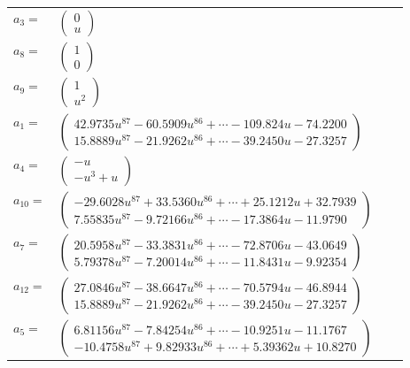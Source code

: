 \documentclass[1p]{elsarticle_modified}
\theoremstyle{definition}
\begin{document}
\begin{tabular}{m{7pt} m{180pt} m{7pt} m{180pt} }
\flushright $a_{3}=$&$\begin{pmatrix}0\\u\end{pmatrix}$ \\
\flushright $a_{8}=$&$\begin{pmatrix}1\\0\end{pmatrix}$ \\
\flushright $a_{9}=$&$\begin{pmatrix}1\\u^2\end{pmatrix}$ \\
\flushright $a_{1}=$&$\begin{pmatrix}42.9735 u^{87}-60.5909 u^{86}+\cdots-109.824 u-74.2200\\15.8889 u^{87}-21.9262 u^{86}+\cdots-39.2450 u-27.3257\end{pmatrix}$ \\
\flushright $a_{4}=$&$\begin{pmatrix}- u\\- u^3+u\end{pmatrix}$ \\
\flushright $a_{10}=$&$\begin{pmatrix}-29.6028 u^{87}+33.5360 u^{86}+\cdots+25.1212 u+32.7939\\7.55835 u^{87}-9.72166 u^{86}+\cdots-17.3864 u-11.9790\end{pmatrix}$ \\
\flushright $a_{7}=$&$\begin{pmatrix}20.5958 u^{87}-33.3831 u^{86}+\cdots-72.8706 u-43.0649\\5.79378 u^{87}-7.20014 u^{86}+\cdots-11.8431 u-9.92354\end{pmatrix}$ \\
\flushright $a_{12}=$&$\begin{pmatrix}27.0846 u^{87}-38.6647 u^{86}+\cdots-70.5794 u-46.8944\\15.8889 u^{87}-21.9262 u^{86}+\cdots-39.2450 u-27.3257\end{pmatrix}$ \\
\flushright $a_{5}=$&$\begin{pmatrix}6.81156 u^{87}-7.84254 u^{86}+\cdots-10.9251 u-11.1767\\-10.4758 u^{87}+9.82933 u^{86}+\cdots+5.39362 u+10.8270\end{pmatrix}$ \\

\end{tabular}
\end{document}

